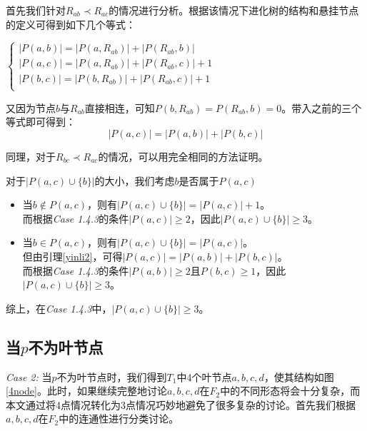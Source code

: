 首先我们针对$R_{ab} \prec R_{ac}$的情况进行分析。根据该情况下进化树的结构和悬挂节点的定义可得到如下几个等式：

\begin{center}
$\left\{
\begin{array}{lr}
	|P(a,b)| = |P(a,R_{ab})| + |P(R_{ab},b)|\\
	|P(a,c)| = |P(a,R_{ab})| + |P(R_{ab},c)| + 1\\
	|P(b,c)| = |P(b,R_{ab})| + |P(R_{ab},c)| + 1\\
\end{array}
\right.$
\end{center}
又因为节点$b$与$R_{ab}$直接相连，可知$P(b,R_{ab}) =P(R_{ab},b) = 0$。带入之前的三个等式即可得到：
\begin{equation*}
|P(a,c)| = |P(a,b)|+|P(b,c)|
\end{equation*}

同理，对于$R_{bc} \prec R_{ac}$的情况，可以用完全相同的方法证明。

\clearpage

对于$|P(a,c) \cup \{b\}|$的大小，我们考虑$b$是否属于$P(a,c)$
\begin{itemize}
	\item 当$b \notin P(a,c)$，则有$|P(a,c) \cup \{b\}| = |P(a,c)|+1$。\\
		而根据\textit{Case 1.4.3}的条件$|P(a,c)| \ge 2$，因此$|P(a,c) \cup \{b\}| \ge 3$。
	\item 当$b \in P(a,c)$，则有$|P(a,c) \cup \{b\}| = |P(a,c)|$。\\
		但由引理\ref{yinli2}，可得$|P(a,c)| = |P(a,b)| + |P(b,c)|$。\\
		而根据\textit{Case 1.4.3}的条件$|P(a,b)| \ge 2$且$P(b,c) \ge 1$，因此$|P(a,c) \cup \{b\}| \ge 3$。\\
\end{itemize}
 
综上，在\textit{Case 1.4.3}中，$|P(a,c) \cup \{b\}| \ge 3$。\\


\subsection{当$p$不为叶节点}

\textit{Case 2: }当$p$不为叶节点时，我们得到$T_1$中4个叶节点$a,b,c,d$，使其结构如图\ref{4node}。此时，如果继续完整地讨论$a,b,c,d$在$F_2$中的不同形态将会十分复杂，而本文通过将4点情况转化为3点情况巧妙地避免了很多复杂的讨论。首先我们根据$a,b,c,d$在$F_2$中的连通性进行分类讨论。\\

